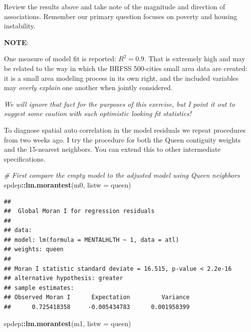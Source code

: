 \documentclass[
]{book}
\newenvironment{Shaded}{\begin{snugshade}}{\end{snugshade}}
\newcommand{\AttributeTok}[1]{\textcolor[rgb]{0.13,0.29,0.53}{#1}}
\newcommand{\CommentTok}[1]{\textcolor[rgb]{0.56,0.35,0.01}{\textit{#1}}}
\newcommand{\FunctionTok}[1]{\textcolor[rgb]{0.13,0.29,0.53}{\textbf{#1}}}
\newcommand{\NormalTok}[1]{#1}
\newcommand{\SpecialCharTok}[1]{\textcolor[rgb]{0.81,0.36,0.00}{\textbf{#1}}}
\newenvironment{rmdnote}[1]
  {
  \begin{itemize}
  \renewcommand{\labelitemi}{
    \raisebox{-.7\height}[0pt][0pt]{
      {\setkeys{Gin}{width=3em,keepaspectratio}\texttt{[image: images/\#1]}}
    }
  }
  \setlength{\fboxsep}{1em}
  \begin{note}
  \item
  }
  {
  \end{note}
  \end{itemize}
  }
\begin{document}
Review the results above and take note of the magnitude and direction of associations. Remember our primary question focuses on poverty and housing instability.

\begin{rmdnote}{note}
\textbf{NOTE}:

One measure of model fit is reported: \(R^2=0.9\). That is extremely high and may be related to the way in which the BRFSS 500-cities small area data are created: it is a small area modeling process in its own right, and the included variables may \emph{overly explain} one another when jointly considered.

\emph{We will ignore that fact for the purposes of this exercise, but I point it out to suggest some caution with such optimistic looking fit statistics!}

\end{rmdnote}

To diagnose spatial auto correlation in the model residuals we repeat procedures from two weeks ago. I try the procedure for both the Queen contiguity weights and the 15-nearest neighbors. You can extend this to other intermediate specifications.

\begin{Shaded}
\begin{Highlighting}[]
\CommentTok{\# First compare the empty model to the adjusted model using Queen neighbors}
\NormalTok{spdep}\SpecialCharTok{::}\FunctionTok{lm.morantest}\NormalTok{(m0, }\AttributeTok{listw =}\NormalTok{ queen)}
\end{Highlighting}
\end{Shaded}

\begin{verbatim}
## 
##  Global Moran I for regression residuals
## 
## data:  
## model: lm(formula = MENTALHLTH ~ 1, data = atl)
## weights: queen
## 
## Moran I statistic standard deviate = 16.515, p-value < 2.2e-16
## alternative hypothesis: greater
## sample estimates:
## Observed Moran I      Expectation         Variance 
##      0.725418358     -0.005434783      0.001958399
\end{verbatim}

\begin{Shaded}
\begin{Highlighting}[]
\NormalTok{spdep}\SpecialCharTok{::}\FunctionTok{lm.morantest}\NormalTok{(m1, }\AttributeTok{listw =}\NormalTok{ queen)}
\end{Highlighting}
\end{Shaded}
\end{document}
